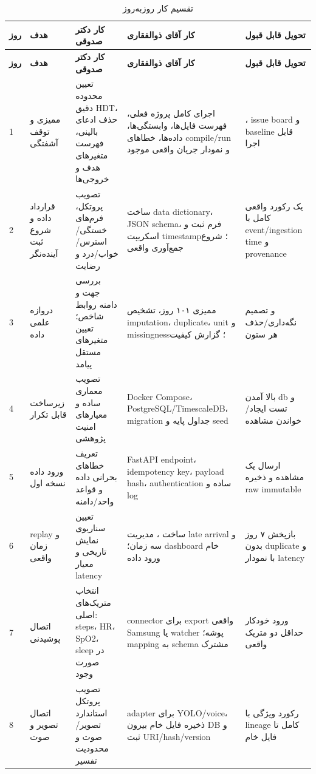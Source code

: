 \documentclass[11pt,a4paper]{article}
\newcommand{\code}[1]{\lr{\texttt{\detokenize{#1}}}}
\begin{document}
\begin{landscape}
\small
\begin{longtable}{p{}p{}p{}p{}p{}}
\caption{تقسیم کار روزبه‌روز}\label{tab:plan20}\\
\toprule
\textbf{روز} & \textbf{هدف} & \textbf{کار دکتر صدوقی} & \textbf{کار آقای ذوالفقاری} & \textbf{تحویل قابل قبول}\\
\midrule
\endfirsthead
\toprule
\textbf{روز} & \textbf{هدف} & \textbf{کار دکتر صدوقی} & \textbf{کار آقای ذوالفقاری} & \textbf{تحویل قابل قبول}\\
\midrule
\endhead
1 & ممیزی و توقف آشفتگی & تعیین محدوده دقیق HDT، حذف ادعای بالینی، فهرست متغیرهای هدف و خروجی‌ها & اجرای کامل پروژه فعلی، فهرست فایل‌ها، وابستگی‌ها، داده‌ها، خطاهای compile/run و نمودار جریان واقعی موجود & \code{CURRENT_STATE.md}، issue board و baseline قابل اجرا\\
2 & قرارداد داده و شروع ثبت آینده‌نگر & تصویب پروتکل، فرم‌های خستگی/استرس/خواب/درد و رضایت & ساخت data dictionary، JSON schema، فرم ثبت و اسکریپت timestamp؛ شروع جمع‌آوری واقعی & یک رکورد واقعی کامل با event/ingestion time و provenance\\
3 & دروازه علمی داده & بررسی جهت و دامنه روابط شاخص؛ تعیین متغیرهای مستقل پیامد & ممیزی ۱۰۱ روز، تشخیص imputation، duplicate، unit و missingness؛ گزارش کیفیت & \code{data_audit.html/csv} و تصمیم نگه‌داری/حذف هر ستون\\
4 & زیرساخت قابل تکرار & تصویب معماری ساده و معیارهای امنیت پژوهشی & Docker Compose، PostgreSQL/TimescaleDB، migration جداول پایه و seed & بالا آمدن db و تست ایجاد/خواندن مشاهده\\
5 & ورود داده نسخه اول & تعریف خطاهای بحرانی داده و قواعد واحد/دامنه & FastAPI endpoint، idempotency key، payload hash، authentication ساده و log & ارسال یک مشاهده و ذخیره raw immutable\\
6 & replay و زمان واقعی & تعیین سناریوی نمایش تاریخی و معیار latency & ساخت \code{replay.py}، مدیریت late arrival و سه زمان؛ dashboard خام ورود داده & بازپخش ۷ روز بدون duplicate و با نمودار latency\\
7 & اتصال پوشیدنی & انتخاب متریک‌های اصلی: steps، HR، SpO2، sleep در صورت وجود & connector برای export واقعی Samsung یا watcher پوشه؛ mapping به schema مشترک & ورود خودکار حداقل دو متریک واقعی\\
8 & اتصال تصویر و صوت & تصویب پروتکل استاندارد تصویر/صوت و محدودیت تفسیر & adapter برای YOLO/voice، ذخیره فایل خام بیرون DB و ثبت URI/hash/version & رکورد ویژگی با lineage کامل تا فایل خام\\

\end{longtable}
\end{landscape}
\end{document}
